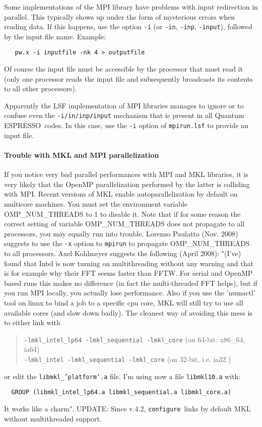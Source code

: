 \documentclass[12pt,a4paper]{article}
\def\qe{{\sc Quantum ESPRESSO}}
\def\configure{\texttt{configure}}
\begin{document}
Some implementations of the MPI library have problems with input
redirection in parallel. This typically shows up under the form of
mysterious errors when reading data. If this happens, use the option
\texttt{-i} (or \texttt{-in}, \texttt{-inp}, \texttt{-input}),
followed by the input file name.
Example:
\begin{verbatim}
   pw.x -i inputfile -nk 4 > outputfile
\end{verbatim}
Of course the
input file must be accessible by the processor that must read it
(only one processor reads the input file and subsequently broadcasts
its contents to all other processors).

Apparently the LSF implementation of MPI libraries manages to ignore or to
confuse even the \texttt{-i/in/inp/input} mechanism that is present in all
\qe\ codes. In this case, use the \texttt{-i} option of \texttt{mpirun.lsf}
to provide an input file.

\paragraph{Trouble with MKL and MPI parallelization}
If you notice very bad parallel performances with MPI and MKL libraries,
it is very likely that the OpenMP parallelization performed by the latter
is colliding with MPI. Recent versions of MKL enable autoparallelization
by default on multicore machines.  You must set the environment variable
OMP\_NUM\_THREADS to 1 to disable it.
Note that if for some reason the correct setting  of variable
OMP\_NUM\_THREADS
does not propagate to all processors, you may equally run into trouble.
Lorenzo Paulatto (Nov. 2008) suggests to use the \texttt{-x} option to \texttt{mpirun} to
propagate OMP\_NUM\_THREADS to all processors.
Axel Kohlmeyer suggests the following (April 2008):
"(I've) found that Intel is now turning on multithreading without any
warning and that is for example why their FFT seems faster than
FFTW. For serial and OpenMP based runs this makes no difference (in
fact the multi-threaded FFT helps), but if you run MPI locally, you
actually lose performance. Also if you use the 'numactl' tool on linux
to bind a job to a specific cpu core, MKL will still try to use all
available cores (and slow down badly). The cleanest way of avoiding
this mess is to either link with
\begin{quote}
\texttt{-lmkl\_intel\_lp64 -lmkl\_sequential -lmkl\_core} (on 64-bit:
x86\_64, ia64)\\
\texttt{-lmkl\_intel -lmkl\_sequential -lmkl\_core} (on 32-bit, i.e. ia32 )
\end{quote}
or edit the \texttt{libmkl\_'platform'.a} file. I'm using now a file
\texttt{libmkl10.a} with:
\begin{verbatim}
  GROUP (libmkl_intel_lp64.a libmkl_sequential.a libmkl_core.a)
\end{verbatim}
It works like a charm". UPDATE: Since v.4.2, \configure\ links by
default MKL without multithreaded support.
\end{document}
